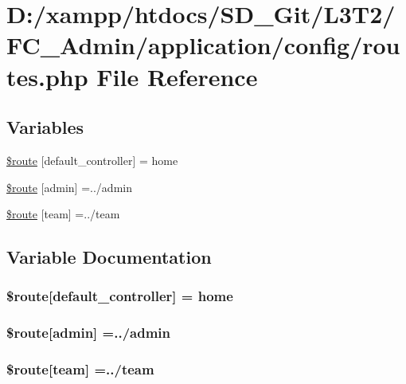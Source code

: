 \hypertarget{routes_8php}{}\section{D\+:/xampp/htdocs/\+S\+D\+\_\+\+Git/\+L3\+T2/\+F\+C\+\_\+\+Admin/application/config/routes.php File Reference}
\label{routes_8php}
\subsection*{Variables}
\begin{DoxyCompactItemize}
\item 
\hyperlink{routes_8php_a6c2a82e4cec825eb1921141d08af834b}{\$route} \mbox{[}\textquotesingle{}default\+\_\+controller\textquotesingle{}\mbox{]} = \textquotesingle{}home\textquotesingle{}
\item 
\hyperlink{routes_8php_a740e1be77b5d698dffaec236d905a70f}{\$route} \mbox{[}\textquotesingle{}admin\textquotesingle{}\mbox{]} =\textquotesingle{}../admin\textquotesingle{}
\item 
\hyperlink{routes_8php_a24c71ec5d89877e8866d4fb7d4dbc4ed}{\$route} \mbox{[}\textquotesingle{}team\textquotesingle{}\mbox{]} =\textquotesingle{}../team\textquotesingle{}
\end{DoxyCompactItemize}


\subsection{Variable Documentation}
\hypertarget{routes_8php_a6c2a82e4cec825eb1921141d08af834b}{}
\subsubsection[{\$route}]{\setlength{\rightskip}{0pt plus 5cm}\$route\mbox{[}\textquotesingle{}default\+\_\+controller\textquotesingle{}\mbox{]} = \textquotesingle{}home\textquotesingle{}}\label{routes_8php_a6c2a82e4cec825eb1921141d08af834b}
\hypertarget{routes_8php_a740e1be77b5d698dffaec236d905a70f}{}
\subsubsection[{\$route}]{\setlength{\rightskip}{0pt plus 5cm}\$route\mbox{[}\textquotesingle{}admin\textquotesingle{}\mbox{]} =\textquotesingle{}../admin\textquotesingle{}}\label{routes_8php_a740e1be77b5d698dffaec236d905a70f}
\hypertarget{routes_8php_a24c71ec5d89877e8866d4fb7d4dbc4ed}{}
\subsubsection[{\$route}]{\setlength{\rightskip}{0pt plus 5cm}\$route\mbox{[}\textquotesingle{}team\textquotesingle{}\mbox{]} =\textquotesingle{}../team\textquotesingle{}}\label{routes_8php_a24c71ec5d89877e8866d4fb7d4dbc4ed}
